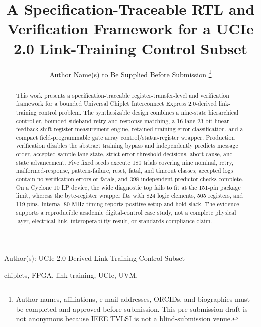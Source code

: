 \documentclass[journal]{IEEEtran}
\begin{document}
\title{A Specification-Traceable RTL and Verification Framework for a UCIe 2.0 Link-Training Control Subset}

\author{Author Name(s) to Be Supplied Before Submission%
\thanks{Author names, affiliations, e-mail addresses, ORCIDs, and biographies
must be completed and approved before submission. This pre-submission draft is
not anonymous because IEEE TVLSI is not a blind-submission venue.}}

%
{Author(s): UCIe 2.0-Derived Link-Training Control Subset}

\maketitle

\begin{abstract}
This work presents a specification-traceable register-transfer-level and verification framework for a bounded Universal Chiplet Interconnect Express 2.0-derived link-training control problem. The synthesizable design combines a nine-state hierarchical controller, bounded sideband retry and response matching, a 16-lane 23-bit linear-feedback shift-register measurement engine, retained training-error classification, and a compact field-programmable gate array control/status-register wrapper. Production verification disables the abstract training bypass and independently predicts message order, accepted-sample lane state, strict error-threshold decisions, abort cause, and state advancement. Five fixed seeds execute 180 trials covering nine nominal, retry, malformed-response, pattern-failure, reset, fatal, and timeout classes; accepted logs contain no verification errors or fatals, and 398 independent predictor checks complete. On a Cyclone 10 LP device, the wide diagnostic top fails to fit at the 151-pin package limit, whereas the byte-register wrapper fits with 824 logic elements, 505 registers, and 119 pins. Internal 80-MHz timing reports positive setup and hold slack. The evidence supports a reproducible academic digital-control case study, not a complete physical layer, electrical link, interoperability result, or standards-compliance claim.
\end{abstract}

\begin{IEEEkeywords}
chiplets, FPGA, link training, UCIe, UVM.
\end{IEEEkeywords}








\end{document}
